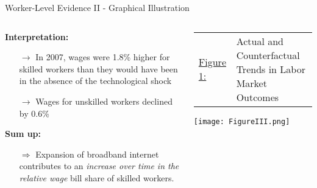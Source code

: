 \documentclass[compress, aspectratio=169, xcolor=dvipsnames]{beamer}
\begin{document}
\begin{frame}{Worker-Level Evidence II - Graphical Illustration}

\begin{columns}[t]
	
\begin{column}{0.55\textwidth}

\vspace{5pt}
\textbf{Interpretation:}
\begin{itemize}
	
	\item[$\rightarrow$] In 2007, wages were 1.8\% higher for skilled workers than they would have been in the absence of the technological shock
	\item[$\rightarrow$] Wages for unskilled workers declined by 0.6\%
\end{itemize}
\vspace{5pt}
\textbf{Sum up:}
\begin{itemize}
	\item[$\Rightarrow$] Expansion of broadband internet contributes to an \textit{increase over time in the relative wage} bill share of skilled workers.
\end{itemize}
\end{column}

\begin{column}{0.45\textwidth}
    \centering 
	\vspace{-2pt}
    \scriptsize{
    \begin{tabular}{l p{4.5cm}}
    \underline{Figure 1:} & Actual and Counterfactual Trends in Labor Market Outcomes
    \end{tabular}
    }
    \texttt{[image: FigureIII.png]}

    
\end{column}
	
\end{columns}
	
\end{frame}
\end{document}
